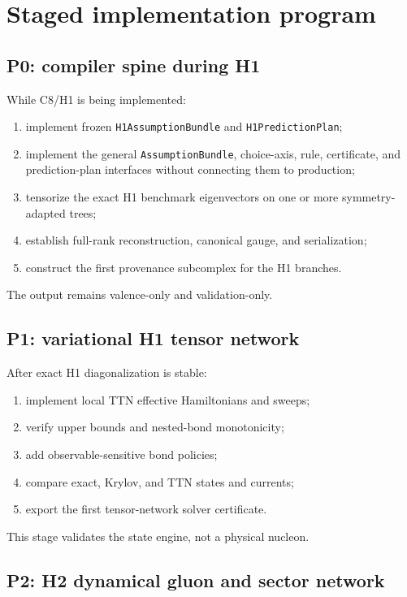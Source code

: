 \documentclass[11pt]{article}
\newcommand{\AssumptionBundle}{\texttt{AssumptionBundle}}
\begin{document}
\section{Staged implementation program}
\label{sec:staged-program}

\subsection{P0: compiler spine during H1}

While C8/H1 is being implemented:
\begin{enumerate}
 \item implement frozen \texttt{H1AssumptionBundle} and
 \texttt{H1PredictionPlan};
 \item implement the general \AssumptionBundle, choice-axis, rule, certificate,
 and prediction-plan interfaces without connecting them to production;
 \item tensorize the exact H1 benchmark eigenvectors on one or more symmetry-
 adapted trees;
 \item establish full-rank reconstruction, canonical gauge, and serialization;
 \item construct the first provenance subcomplex for the H1 branches.
\end{enumerate}
The output remains valence-only and validation-only.

\subsection{P1: variational H1 tensor network}

After exact H1 diagonalization is stable:
\begin{enumerate}
 \item implement local TTN effective Hamiltonians and sweeps;
 \item verify upper bounds and nested-bond monotonicity;
 \item add observable-sensitive bond policies;
 \item compare exact, Krylov, and TTN states and currents;
 \item export the first tensor-network solver certificate.
\end{enumerate}
This stage validates the state engine, not a physical nucleon.

\subsection{P2: H2 dynamical gluon and sector network}
\end{document}
